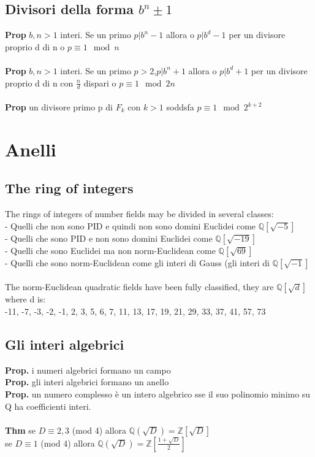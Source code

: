 \documentclass[10pt,a4paper]{article}
\begin{document}
\subsection{Divisori della forma $b^n \pm 1$}
\textbf{Prop} $b,n>1$ interi. Se un primo $p | b^n-1$ allora o $p|b^d-1$ per un divisore proprio d di n o $p\equiv 1 \mod n$\\\\
\textbf{Prop} $b,n>1$ interi. Se un primo $p>2$,$p | b^n+1$ allora o $p|b^d+1$ per un divisore proprio d di n con $\frac{n}{d}$ dispari o $p\equiv 1 \mod 2n$\\\\
\textbf{Prop} un divisore primo p di $F_k$ con $k>1$ soddsfa $p\equiv 1 \mod 2^{k+2}$
\newpage
\section{Anelli}
\subsection{The ring of integers}
The rings of integers of number fields may be divided in several classes:\\
- Quelli che non sono PID e quindi non sono domini Euclidei come $\mathbb{Q}[\sqrt{-5}]$\\
- Quelli che sono PID e non sono domini Euclidei come $\mathbb{Q}[\sqrt{-19}]$\\
- Quelli che sono Euclidei ma non norm-Euclidean come $\mathbb{Q}[\sqrt{69}]$\\
- Quelli che sono norm-Euclidean come gli interi di Gauss (gli interi di $\mathbb{Q}[\sqrt{-1}]$\\\\
The norm-Euclidean quadratic fields have been fully classified, they are $\mathbb{Q}[\sqrt{d}]$ where d is:\\
-11, -7, -3, -2, -1, 2, 3, 5, 6, 7, 11, 13, 17, 19, 21, 29, 33, 37, 41, 57, 73
\subsection{Gli interi algebrici}
\textbf{Prop.} i numeri algebrici formano un campo\\
\textbf{Prop.} gli interi algebrici formano un anello\\
\textbf{Prop.} un numero complesso è un intero algebrico sse il suo polinomio minimo su Q ha coefficienti interi.\\\\
\textbf{Thm} se $D \equiv 2,3$ (mod 4) allora $\mathbb{Q}(\sqrt D) = \mathbb{Z}[\sqrt D]$\\
se $D \equiv 1$ (mod 4) allora $\mathbb{Q}(\sqrt D) = \mathbb{Z}[\frac{1+ \sqrt D}{2}]$
\end{document}
